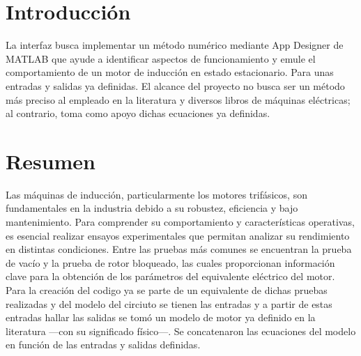 \section{Introducción}
La interfaz busca implementar un método numérico mediante App Designer de MATLAB que ayude a identificar aspectos de funcionamiento y emule el comportamiento de un motor de inducción en estado estacionario. Para unas entradas y salidas ya definidas. El alcance del proyecto no busca ser un método más preciso al empleado en la literatura y diversos libros de máquinas eléctricas; al contrario, toma como apoyo dichas ecuaciones ya definidas.

\section{Resumen}
Las máquinas de inducción, particularmente los motores trifásicos, son fundamentales en la industria debido a su robustez, eficiencia y bajo mantenimiento. Para comprender su comportamiento y características operativas, es esencial realizar ensayos experimentales que permitan analizar su rendimiento en distintas condiciones. Entre las pruebas más comunes se encuentran la prueba de vacío y la prueba de rotor bloqueado, las cuales proporcionan información clave para la obtención de los parámetros del equivalente eléctrico del motor. Para la creación del codigo ya se parte de un equivalente de dichas pruebas realizadas y del modelo del circiuto se tienen las entradas y a partir de estas entradas hallar las salidas se tomó un modelo de motor ya definido en la literatura —con su significado físico—. Se concatenaron las ecuaciones del modelo en función de las entradas y salidas definidas.

